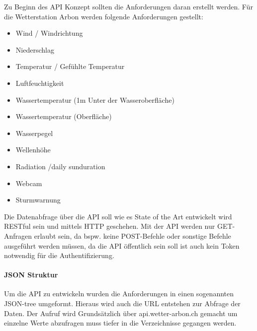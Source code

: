 Zu Beginn des API Konzept sollten die Anforderungen daran erstellt werden. Für die Wetterstation Arbon werden folgende Anforderungen gestellt:
\begin{itemize}
\item Wind / Windrichtung
\item Niederschlag
\item Temperatur / Gefühlte Temperatur
\item Luftfeuchtigkeit
\item Wassertemperatur (1m Unter der Wasseroberfläche)
\item Wassertemperatur (Oberfläche)
\item Wasserpegel
\item Wellenhöhe
\item Radiation /daily sunduration
\item Webcam
\item Sturmwarnung
\end{itemize}
Die Datenabfrage über die API soll wie es State of the Art entwickelt wird RESTful sein und mittels HTTP geschehen. Mit der API werden nur GET-Anfragen erlaubt sein, da bspw. keine POST-Befehle oder sonstige Befehle ausgeführt werden müssen, da die API öffentlich sein soll ist auch kein Token notwendig für die Authentifizierung.

\paragraph{JSON Struktur}

Um die API zu entwickeln wurden die Anforderungen in einen sogenannten JSON-tree umgeformt. Hieraus wird auch die URL entstehen zur Abfrage der Daten. Der Aufruf wird Grundsätzlich über api.wetter-arbon.ch gemacht um einzelne Werte abzufragen muss tiefer in die Verzeichnisse gegangen werden.

